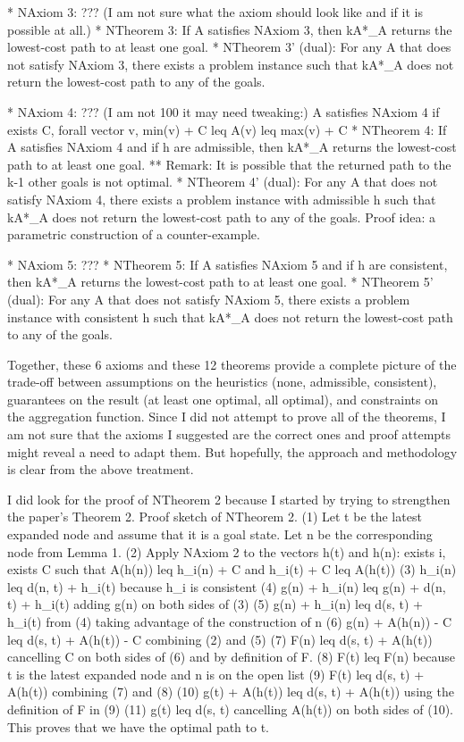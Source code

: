 * NAxiom 3: ??? (I am not sure what the axiom should look like and if
it is possible at all.)
* NTheorem 3: If A satisfies NAxiom 3, then kA*_A returns the
lowest-cost path to at least one goal.
* NTheorem 3' (dual): For any A that does not satisfy NAxiom 3, there
exists a problem instance such that kA*_A does not return the
lowest-cost path to any of the goals.

* NAxiom 4: ??? (I am not 100%
it may need tweaking:) A satisfies NAxiom 4 if exists C, forall vector
v, min(v) + C leq A(v) leq max(v) + C
* NTheorem 4: If A satisfies NAxiom 4 and if h are admissible, then
kA*_A returns the lowest-cost path to at least one goal.
** Remark: It is possible that the returned path to the k-1 other
goals is not optimal.
* NTheorem 4' (dual): For any A that does not satisfy NAxiom 4, there
exists a problem instance with admissible h such that kA*_A does not
return the lowest-cost path to any of the goals.
Proof idea: a parametric construction of a counter-example.

* NAxiom 5: ???
* NTheorem 5: If A satisfies NAxiom 5 and if h are consistent, then
kA*_A returns the lowest-cost path to at least one goal.
* NTheorem 5' (dual): For any A that does not satisfy NAxiom 5, there
exists a problem instance with consistent h such that kA*_A does not
return the lowest-cost path to any of the goals.



Together, these 6 axioms and these 12 theorems provide a complete
picture of the trade-off between assumptions on the heuristics (none,
admissible, consistent), guarantees on the result (at least one
optimal, all optimal), and constraints on the aggregation function.
Since I did not attempt to prove all of the theorems, I am not sure
that the axioms I suggested are the correct ones and proof attempts
might reveal a need to adapt them. But hopefully, the approach and
methodology is clear from the above treatment.

I did look for the proof of NTheorem 2 because I started by trying to
strengthen the paper's Theorem 2.
Proof sketch of NTheorem 2.
(1) Let t be the latest expanded node and assume that it is a goal
state. Let n be the corresponding node from Lemma 1.
(2) Apply NAxiom 2 to the vectors h(t) and h(n): exists i, exists C
such that A(h(n)) leq h_i(n) + C and h_i(t) + C leq A(h(t))
(3) h_i(n) leq d(n, t) + h_i(t) because h_i is consistent
(4) g(n) + h_i(n) leq g(n) + d(n, t) + h_i(t) adding g(n) on both
sides of (3)
(5) g(n) + h_i(n) leq d(s, t) + h_i(t) from (4) taking advantage of
the construction of n
(6) g(n) + A(h(n)) - C leq d(s, t) + A(h(t)) - C combining (2) and
(5)
(7) F(n) leq d(s, t) + A(h(t)) cancelling C on both sides of (6) and
by definition of F.
(8) F(t) leq F(n) because t is the latest expanded node and n is on
the open list
(9) F(t) leq d(s, t) + A(h(t)) combining (7) and (8)
(10) g(t) + A(h(t)) leq d(s, t) + A(h(t)) using the definition of F in
(9)
(11) g(t) leq d(s, t) cancelling A(h(t)) on both sides of (10).
This proves that we have the optimal path to t.



